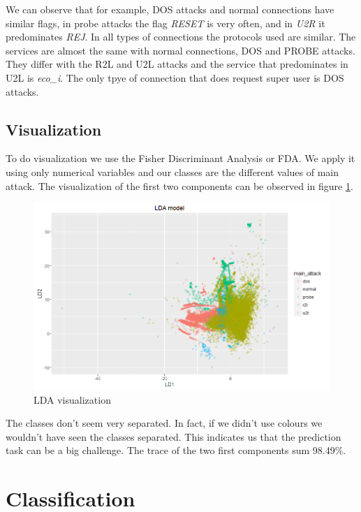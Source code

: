 \documentclass[a4paper]{article} %
\begin{document}
We can observe that for example, DOS attacks and normal connections have similar flags, in probe attacks the flag \textit{RESET} is very often, and in \textit{U2R} it predominates \textit{REJ}. In all types of connections the protocols used are similar. The services are almost the same with normal connections, DOS and PROBE attacks. They differ with the R2L and U2L attacks and the service that predominates in U2L is \textit{eco\_i}. The only tpye of connection that does request super user is DOS attacks.
\subsection{Visualization}
To do visualization we use the Fisher Discriminant Analysis or FDA. We apply it using only numerical variables and our classes are the different values of main attack. The visualization of the first two components can be observed in figure \ref{fig:fda}.

\begin{figure}[H]
	\centering
	\includegraphics[scale=0.45]{LDA.png}
	\caption{LDA visualization}
	\label{fig:fda}
\end{figure}

The classes don't seem very separated. In fact, if we didn't use colours we wouldn't have seen the classes separated. This indicates us that the prediction task can be a big challenge. The trace of the two first components sum 98.49\%.





\section{Classification}
\end{document}
